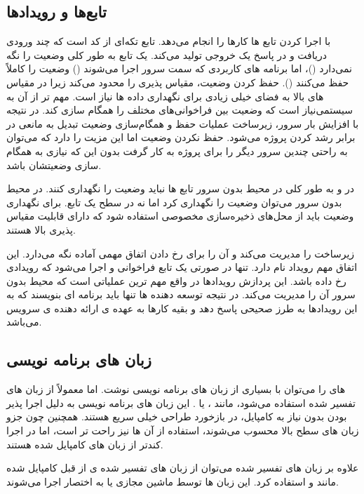 \subsection{تابع‌ها و رویدادها}

 با اجرا کردن تابع ها کارها را انجام می‌دهد. تابع تکه‌ای از کد است که چند ورودی دریافت و در پاسخ یک خروجی تولید می‌کند. یک تابع به طور کلی وضعیت را نگه نمی‌دارد ()، اما برنامه های کاربردی که سمت سرور اجرا می‌شوند (‌) وضعیت را کاملاً حفظ می‌کنند (). حفظ کردن وضعیت، مقیاس پذیری را محدود می‌کند زیرا در مقیاس های بالا به فضای خیلی زیادی برای نگهداری داده ها نیاز است. مهم تر از آن به سیستمی‌نیاز است که وضعیت بین فراخوانی‌های مختلف را همگام سازی کند. در نتیجه با افزایش بار سرور، زیرساخت عملیات حفظ و همگام‌سازی وضعیت تبدیل به مانعی در برابر رشد کردن پروژه می‌شود. حفظ نکردن وضعیت اما این مزیت را دارد که می‌توان به راحتی چندین سرور دیگر را برای پروژه به کار گرفت بدون این که نیازی به همگام سازی وضعیتشان باشد.

در  و به طور کلی در محیط بدون سرور تابع ها نباید وضعیت را نگهداری کنند. در محیط بدون سرور می‌توان وضعیت را نگهداری کرد اما نه در سطح یک تابع. برای نگهداری وضعیت باید از محل‌های ذخیره‌سازی مخصوصی استفاده شود که دارای قابلیت مقیاس پذیری بالا هستند.

 زیرساخت را مدیریت می‌کند و آن را برای رخ دادن اتفاق مهمی آماده نگه می‌دارد. این اتفاق مهم رویداد نام دارد. تنها در صورتی یک تابع فراخوانی و اجرا می‌شود که رویدادی رخ داده باشد. این پردازش رویدادها در واقع مهم ترین عملیاتی است که محیط بدون سرور آن را مدیریت می‌کند. در نتیجه توسعه دهنده ها تنها باید برنامه ای بنویسند که به این رویدادها به طرز صحیحی پاسخ دهد و بقیه کارها به عهده ی ارائه دهنده ی سرویس می‌باشد.

\subsection{زبان های برنامه نویسی }

 های  را می‌توان با بسیاری از زبان های برنامه نویسی نوشت. اما معمولاً از زبان های تفسیر شده استفاده می‌شود، مانند ،  یا . این زبان های برنامه نویسی به دلیل اجرا پذیر بودن بدون نیاز به کامپایل، در بازخورد طراحی خیلی سریع هستند. همچنین چون جزو زبان های سطح بالا محسوب می‌شوند، استفاده از آن ها نیز راحت تر است، اما در اجرا کندتر از زبان های کامپایل شده هستند.

علاوه بر زبان های تفسیر شده می‌توان از زبان های تفسیر شده ی از قبل کامپایل شده مانند  و  استفاده کرد. این زبان ها توسط ماشین مجازی  یا به اختصار  اجرا می‌شوند.

